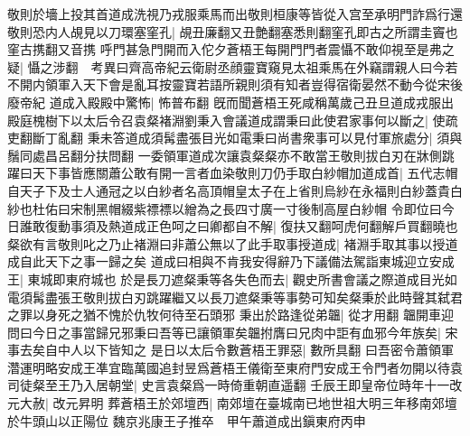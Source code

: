 敬則於墻上投其首道成洗視乃戎服乘馬而出敬則桓康等皆從入宫至承明門詐爲行還敬則恐内人覘見以刀環塞窐孔|{
	覘丑廉翻又丑艶翻塞悉則翻窐孔即古之所謂圭竇也窐古携翻又音携}
呼門甚急門開而入佗夕蒼梧王每開門門者震懾不敢仰視至是弗之疑|{
	懾之涉翻　考異曰齊高帝紀云衛尉丞顔靈寶窺見太祖乘馬在外竊謂親人曰今若不開内領軍入天下會是亂耳按靈寶若語所親則須有知者豈得宿衛晏然不動今從宋後廢帝紀}
道成入殿殿中驚怖|{
	怖普布翻}
旣而聞蒼梧王死咸稱萬歲己丑旦道成戎服出殿庭槐樹下以太后令召袁粲褚淵劉秉入會議道成謂秉曰此使君家事何以斷之|{
	使疏吏翻斷丁亂翻}
秉未答道成須髯盡張目光如電秉曰尚書衆事可以見付軍旅處分|{
	須與鬚同處昌呂翻分扶問翻}
一委領軍道成次讓袁粲粲亦不敢當王敬則拔白刃在牀側跳躍曰天下事皆應關蕭公敢有開一言者血染敬則刀仍手取白紗帽加道成首|{
	五代志帽自天子下及士人通冠之以白紗者名高頂帽皇太子在上省則烏紗在永福則白紗蓋貴白紗也杜佑曰宋制黑帽綴紫褾褾以繒為之長四寸廣一寸後制高屋白紗帽}
令即位曰今日誰敢復動事須及熱道成正色呵之曰卿都自不解|{
	復扶又翻呵虎何翻解戶買翻曉也}
粲欲有言敬則叱之乃止褚淵曰非蕭公無以了此手取事授道成|{
	褚淵手取其事以授道成自此天下之事一歸之矣}
道成曰相與不肯我安得辭乃下議備法駕詣東城迎立安成王|{
	東城即東府城也}
於是長刀遮粲秉等各失色而去|{
	觀史所書會議之際道成目光如電須髯盡張王敬則拔白刃跳躍繼又以長刀遮粲秉等事勢可知矣粲秉於此時聲其弑君之罪以身死之猶不愧於仇牧何待至石頭邪}
秉出於路逢從弟韞|{
	從才用翻}
韞開車迎問曰今日之事當歸兄邪秉曰吾等已讓領軍矣韞拊膺曰兄肉中詎有血邪今年族矣|{
	宋事去矣自中人以下皆知之}
是日以太后令數蒼梧王罪惡|{
	數所具翻}
曰吾密令蕭領軍濳運明略安成王凖宜臨萬國追封昱爲蒼梧王儀衛至東府門安成王令門者勿開以待袁司徒粲至王乃入居朝堂|{
	史言袁粲爲一時倚重朝直遥翻}
壬辰王即皇帝位時年十一改元大赦|{
	改元昇明}
葬蒼梧王於郊壇西|{
	南郊壇在臺城南已地世祖大明三年移南郊壇於牛頭山以正陽位}
魏京兆康王子推卒　甲午蕭道成出鎭東府丙申

